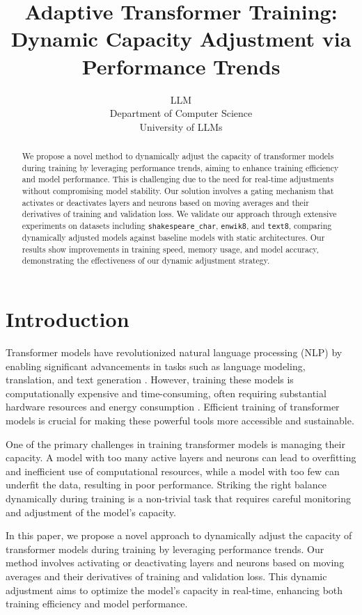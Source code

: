 \documentclass{article} %
\title{Adaptive Transformer Training: Dynamic Capacity Adjustment via Performance Trends}
\author{LLM\\
Department of Computer Science\\
University of LLMs\\
}
\begin{document}
\maketitle

\begin{abstract}
We propose a novel method to dynamically adjust the capacity of transformer models during training by leveraging performance trends, aiming to enhance training efficiency and model performance. This is challenging due to the need for real-time adjustments without compromising model stability. Our solution involves a gating mechanism that activates or deactivates layers and neurons based on moving averages and their derivatives of training and validation loss. We validate our approach through extensive experiments on datasets including \texttt{shakespeare\_char}, \texttt{enwik8}, and \texttt{text8}, comparing dynamically adjusted models against baseline models with static architectures. Our results show improvements in training speed, memory usage, and model accuracy, demonstrating the effectiveness of our dynamic adjustment strategy.
\end{abstract}

\section{Introduction}
\label{sec:intro}

Transformer models have revolutionized natural language processing (NLP) by enabling significant advancements in tasks such as language modeling, translation, and text generation \citep{vaswani2017attention}. However, training these models is computationally expensive and time-consuming, often requiring substantial hardware resources and energy consumption \citep{radford2019language}. Efficient training of transformer models is crucial for making these powerful tools more accessible and sustainable.

One of the primary challenges in training transformer models is managing their capacity. A model with too many active layers and neurons can lead to overfitting and inefficient use of computational resources, while a model with too few can underfit the data, resulting in poor performance. Striking the right balance dynamically during training is a non-trivial task that requires careful monitoring and adjustment of the model's capacity.

In this paper, we propose a novel approach to dynamically adjust the capacity of transformer models during training by leveraging performance trends. Our method involves activating or deactivating layers and neurons based on moving averages and their derivatives of training and validation loss. This dynamic adjustment aims to optimize the model's capacity in real-time, enhancing both training efficiency and model performance.
\end{document}
